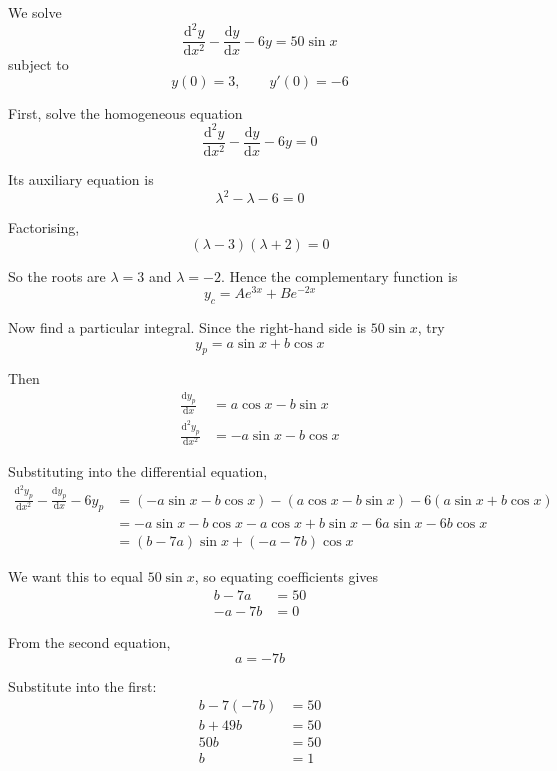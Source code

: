 \documentclass[leqno]{article}
\begin{document}
\begin{enumerate}[
  label=\textbf{\arabic*.},
  leftmargin=*,
  topsep=0pt,
  partopsep=0pt,
  parsep=0pt
]
\vspace*{30pt}

\begin{tcolorbox}[colback=white, colframe=scarlet, title={\textbf{Solution}}, breakable, grow to left by=6mm, grow to right by=10mm]
We solve
\[
\frac{\mathrm{d}^2y}{\mathrm{d}x^2}-\frac{\mathrm{d}y}{\mathrm{d}x}-6y=50\sin x
\]
subject to
\[
y(0)=3, \qquad y'(0)=-6
\]

First, solve the homogeneous equation
\[
\frac{\mathrm{d}^2y}{\mathrm{d}x^2}-\frac{\mathrm{d}y}{\mathrm{d}x}-6y=0
\]

Its auxiliary equation is
\[
\lambda^2-\lambda-6=0
\]

Factorising,
\[
(\lambda-3)(\lambda+2)=0
\]

So the roots are \(\lambda=3\) and \(\lambda=-2\). Hence the complementary function is
\[
y_c=Ae^{3x}+Be^{-2x}
\]

Now find a particular integral. Since the right-hand side is \(50\sin x\), try
\[
y_p=a\sin x+b\cos x
\]

Then
\begin{align*}
\frac{\mathrm{d}y_p}{\mathrm{d}x} &= a\cos x-b\sin x \\
\frac{\mathrm{d}^2y_p}{\mathrm{d}x^2} &= -a\sin x-b\cos x
\end{align*}

Substituting into the differential equation,
\begin{align*}
\frac{\mathrm{d}^2y_p}{\mathrm{d}x^2}-\frac{\mathrm{d}y_p}{\mathrm{d}x}-6y_p
&=\left(-a\sin x-b\cos x\right)-\left(a\cos x-b\sin x\right)-6\left(a\sin x+b\cos x\right) \\
&=-a\sin x-b\cos x-a\cos x+b\sin x-6a\sin x-6b\cos x \\
&=(b-7a)\sin x+(-a-7b)\cos x
\end{align*}

We want this to equal \(50\sin x\), so equating coefficients gives
\begin{align*}
b-7a&=50 \\
-a-7b&=0
\end{align*}

From the second equation,
\[
a=-7b
\]

Substitute into the first:
\begin{align*}
b-7(-7b)&=50 \\
b+49b&=50 \\
50b&=50 \\
b&=1
\end{align*}


\end{tcolorbox}
\end{enumerate}
\end{document}

